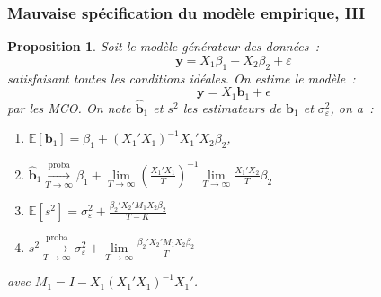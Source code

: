 \documentclass[10pt]{beamer}
\newcommand{\plim}{\overset{\text{proba}}{\underset{T\rightarrow\infty}{\longrightarrow}}}
\theoremstyle{plain}
\newtheorem{prop}{Proposition}
\begin{document}
\begin{frame}
  \frametitle{Mauvaise spécification du modèle empirique, III}

  \begin{prop}\label{prop:mispecification}
    Soit le modèle générateur des données~:
    \[
      \mathbf y = X_1\beta_1 + X_2\beta_2 + \varepsilon
    \]
    satisfaisant toutes les conditions idéales. On estime le modèle~:
    \[
      \mathbf y = X_1\mathbf b_1 + \epsilon
    \]
    par les MCO. On note $\hat{\mathbf b}_1$ et $s^2$ les estimateurs de $\mathbf b_1$ et $\sigma_{\varepsilon}^2$, on a~:
    \begin{enumerate}

    \item $\mathbb E\left[ \mathbf b_1 \right] = \beta_1 + (X_1'X_1)^{-1}X_1'X_2\beta_2$,
    \item $\hat{\mathbf b}_1 \plim \beta_1 + \underset{T\rightarrow\infty}{\lim}\left(\frac{X_1'X_1}{T}\right)^{-1}\underset{T\rightarrow\infty}{\lim}\frac{X_1'X_2}{T}\beta_2$
    \item $\mathbb E\left[s^2\right] = \sigma_{\varepsilon}^2  + \frac{\beta_2'X_2'M_1X_2\beta_2}{T-K}$
    \item $s^2 \plim \sigma_{\varepsilon}^2 + \underset{T\rightarrow\infty}{\lim}\frac{\beta_2'X_2'M_1X_2\beta_2}{T}$
    \end{enumerate}
    avec $M_1 = I-X_1(X_1'X_1)^{-1}X_1'$.
  \end{prop}

\end{frame}
\end{document}
